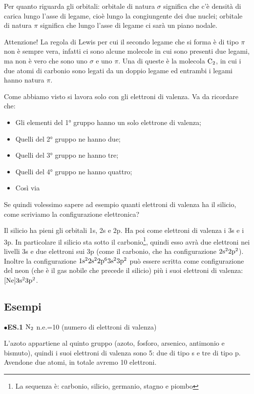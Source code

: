 Per quanto riguarda gli orbitali: orbitale di natura $\sigma$ significa che c'è densità di carica lungo l'asse di legame, cioè lungo la congiungente dei due nuclei; orbitale di natura $\pi$ significa che lungo l'asse di legame ci sarà un piano nodale.

Attenzione! La regola di Lewis per cui il secondo legame che si forma è di tipo $\pi$ non è sempre vera, infatti ci sono alcune molecole in cui sono presenti due legami, ma non è vero che sono uno $\sigma$ e uno $\pi$. Una di queste è la molecola $\rm C_2$, in cui i due atomi di carbonio sono legati da un doppio legame ed entrambi i legami hanno natura $\pi$.

Come abbiamo visto si lavora solo con gli elettroni di valenza. Va da ricordare che:
\begin{itemize}
    \item Gli elementi del 1° gruppo hanno un solo elettrone di valenza;
    \item Quelli del 2° gruppo ne hanno due;
    \item Quelli del 3° gruppo ne hanno tre;
    \item Quelli del 4° gruppo ne hanno quattro;
    \item Così via
\end{itemize}

Se quindi volessimo sapere ad esempio quanti elettroni di valenza ha il silicio, come scriviamo la configurazione elettronica?

Il silicio ha pieni gli orbitali 1s, 2s e 2p. Ha poi come elettroni di valenza i 3s e i 3p. In particolare il silicio sta sotto il carbonio\footnote{La sequenza è: carbonio, silicio, germanio, stagno e piombo}, quindi esso avrà due elettroni nei livelli 3s e due elettroni sui 3p (come il carbonio, che ha configurazione $\rm 2s^22p^2$). Inoltre la configurazione $\rm 1s^22s^22p^63s^23p^2$ può essere scritta come configurazione del neon (che è il gas nobile che precede il silicio) più i suoi elettroni di valenza: $\rm [Ne]3s^23p^2$.

\subsection{Esempi}
    $\bullet$\textbf{ES.1} $\rm N_2$ \quad n.e.=10 (numero di elettroni di valenza)
    
    L'azoto appartiene al quinto gruppo (azoto, fosforo, arsenico, antimonio e bismuto), quindi i suoi elettroni di valenza sono 5: due di tipo s e tre di tipo p. Avendone due atomi, in totale avremo 10 elettroni.

